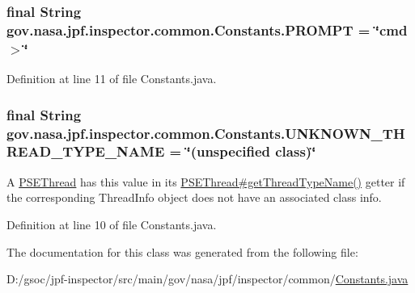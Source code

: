 \subsubsection[{\texorpdfstring{P\+R\+O\+M\+PT}{PROMPT}}]{\setlength{\rightskip}{0pt plus 5cm}final String gov.\+nasa.\+jpf.\+inspector.\+common.\+Constants.\+P\+R\+O\+M\+PT = \char`\"{}cmd$>$\char`\"{}\hspace{0.3cm}{\ttfamily [static]}}\hypertarget{classgov_1_1nasa_1_1jpf_1_1inspector_1_1common_1_1_constants_a174df8b119198d4444a023ee59e74a71}{}\label{classgov_1_1nasa_1_1jpf_1_1inspector_1_1common_1_1_constants_a174df8b119198d4444a023ee59e74a71}


Definition at line 11 of file Constants.\+java.

\subsubsection[{\texorpdfstring{U\+N\+K\+N\+O\+W\+N\+\_\+\+T\+H\+R\+E\+A\+D\+\_\+\+T\+Y\+P\+E\+\_\+\+N\+A\+ME}{UNKNOWN_THREAD_TYPE_NAME}}]{\setlength{\rightskip}{0pt plus 5cm}final String gov.\+nasa.\+jpf.\+inspector.\+common.\+Constants.\+U\+N\+K\+N\+O\+W\+N\+\_\+\+T\+H\+R\+E\+A\+D\+\_\+\+T\+Y\+P\+E\+\_\+\+N\+A\+ME = \char`\"{}(unspecified class)\char`\"{}\hspace{0.3cm}{\ttfamily [static]}}\hypertarget{classgov_1_1nasa_1_1jpf_1_1inspector_1_1common_1_1_constants_a16af7f4c4a75ed492edd02df8515c86c}{}\label{classgov_1_1nasa_1_1jpf_1_1inspector_1_1common_1_1_constants_a16af7f4c4a75ed492edd02df8515c86c}


A \hyperlink{}{P\+S\+E\+Thread} has this value in its \hyperlink{classgov_1_1nasa_1_1jpf_1_1inspector_1_1common_1_1pse_1_1_p_s_e_thread_a6427e811af26702eb971fe73ded1d651}{P\+S\+E\+Thread\#get\+Thread\+Type\+Name()} getter if the corresponding Thread\+Info object does not have an associated class info. 



Definition at line 10 of file Constants.\+java.



The documentation for this class was generated from the following file\+:\begin{DoxyCompactItemize}
\item 
D\+:/gsoc/jpf-\/inspector/src/main/gov/nasa/jpf/inspector/common/\hyperlink{_constants_8java}{Constants.\+java}\end{DoxyCompactItemize}
